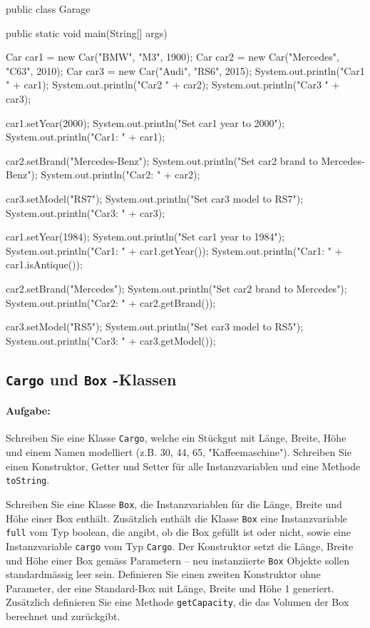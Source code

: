 \documentclass[a4paper,10pt, dvipsnames]{report}
\begin{document}
\begin{javacodebox}
public class Garage {
        
        public static void main(String[] args) {
            Car car1 = new Car("BMW", "M3", 1900);
            Car car2 = new Car("Mercedes", "C63", 2010);
            Car car3 = new Car("Audi", "RS6", 2015);
            System.out.println("Car1 " + car1);
            System.out.println("Car2 " + car2);
            System.out.println("Car3 " + car3);

            car1.setYear(2000);
            System.out.println("Set car1 year to 2000");
            System.out.println("Car1: " + car1);

            car2.setBrand("Mercedes-Benz");
            System.out.println("Set car2 brand to Mercedes-Benz");
            System.out.println("Car2: " + car2);

            car3.setModel("RS7");
            System.out.println("Set car3 model to RS7");
            System.out.println("Car3: " + car3);

            car1.setYear(1984);
            System.out.println("Set car1 year to 1984");
            System.out.println("Car1: " + car1.getYear());
            System.out.println("Car1: " + car1.isAntique());

            car2.setBrand("Mercedes");
            System.out.println("Set car2 brand to Mercedes");
            System.out.println("Car2: " + car2.getBrand());

            car3.setModel("RS5");
            System.out.println("Set car3 model to RS5");
            System.out.println("Car3: " + car3.getModel());
        }
}
\end{javacodebox}

\subsection{\texttt{Cargo} und \texttt{Box} -Klassen}

\paragraph{Aufgabe:}
Schreiben Sie eine Klasse \texttt{Cargo}, welche ein Stückgut mit Länge, Breite, Höhe und einem Namen modelliert (z.B. 30, 44, 65, "Kaffeemaschine"). Schreiben Sie einen Konstruktor, Getter und Setter für alle Instanzvariablen und eine Methode \texttt{toString}.

Schreiben Sie eine Klasse \texttt{Box}, die Instanzvariablen für die Länge, Breite und Höhe einer Box enthält. Zusätzlich enthält die Klasse \texttt{Box} eine Instanzvariable \texttt{full} vom Typ boolean, die angibt, ob die Box gefüllt ist oder nicht, sowie eine Instanzvariable \texttt{cargo} vom Typ \texttt{Cargo}. Der Konstruktor setzt die Länge, Breite und Höhe einer Box gemäss Parametern – neu instanziierte \texttt{Box} Objekte sollen standardmässig leer sein. Definieren Sie einen zweiten Konstruktor ohne Parameter, der eine Standard-Box mit Länge, Breite und Höhe 1 generiert. Zusätzlich definieren Sie eine Methode \texttt{getCapacity}, die das Volumen der Box berechnet und zurückgibt.
\end{document}
